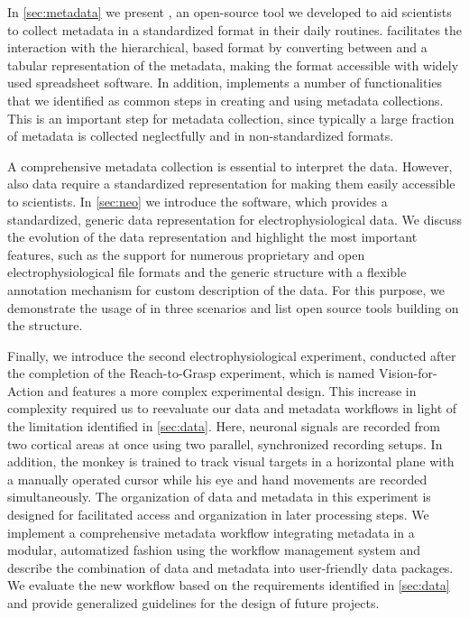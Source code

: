 In \cref{sec:metadata} we present , an open-source tool we developed to aid scientists to collect metadata in a standardized format in their daily routines.  facilitates the interaction with the hierarchical,  based  format by converting between  and a tabular representation of the metadata, making the  format accessible with widely used spreadsheet software. In addition,  implements a number of functionalities that we identified as common steps in creating and using metadata collections. This is an important step for metadata collection, since typically a large fraction of metadata is collected neglectfully and in non-standardized formats.

A comprehensive metadata collection is essential to interpret the data. However, also data require a standardized representation for making them easily accessible to scientists. In \cref{sec:neo} we introduce the  software, which provides a standardized, generic data representation for electrophysiological data. We discuss the evolution of the  data representation and highlight the most important features, such as the support for numerous proprietary and open electrophysiological file formats and the generic structure with a flexible annotation mechanism for custom description of the data. For this purpose, we demonstrate the usage of  in three scenarios and list open source tools building on the  structure.

Finally, we introduce the second electrophysiological experiment, conducted after the completion of the Reach-to-Grasp experiment, which is named Vision-for-Action and features a more complex experimental design. This increase in complexity required us to reevaluate our data and metadata workflows in light of the limitation identified in \cref{sec:data}. Here, neuronal signals are recorded from two cortical areas at once using two parallel, synchronized recording setups. In addition, the monkey is trained to track visual targets in a horizontal plane with a manually operated cursor while his eye and hand movements are recorded simultaneously. The organization of data and metadata in this experiment is designed for facilitated access and organization in later processing steps. We implement a comprehensive metadata workflow integrating metadata in a modular, automatized fashion using the  workflow management system and describe the combination of data and metadata into user-friendly data packages. We evaluate the new workflow based on the requirements identified in \cref{sec:data} and provide generalized guidelines for the design of future projects.


